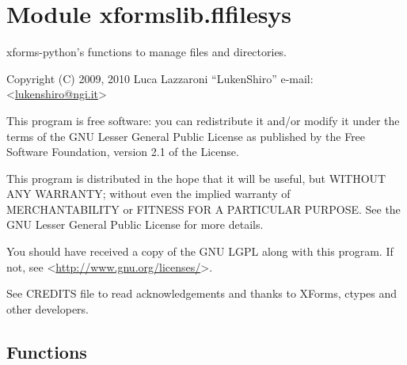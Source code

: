 %
%
%


\section{Module xformslib.flfilesys}

    \label{xformslib:flfilesys}

xforms-python's functions to manage files and directories.

Copyright (C) 2009, 2010  Luca Lazzaroni ``LukenShiro''
e-mail: <\href{mailto:lukenshiro@ngi.it}{lukenshiro@ngi.it}>

This program is free software: you can redistribute it and/or modify
it under the terms of the GNU Lesser General Public License as
published by the Free Software Foundation, version 2.1 of the License.

This program is distributed in the hope that it will be useful,
but WITHOUT ANY WARRANTY; without even the implied warranty of
MERCHANTABILITY or FITNESS FOR A PARTICULAR PURPOSE. See the
GNU Lesser General Public License for more details.

You should have received a copy of the GNU LGPL along with this
program. If not, see <\href{http://www.gnu.org/licenses/}{http://www.gnu.org/licenses/}>.

See CREDITS file to read acknowledgements and thanks to XForms,
ctypes and other developers.


  \subsection{Functions}

    \label{xformslib:flfilesys:fl_get_dirlist}

